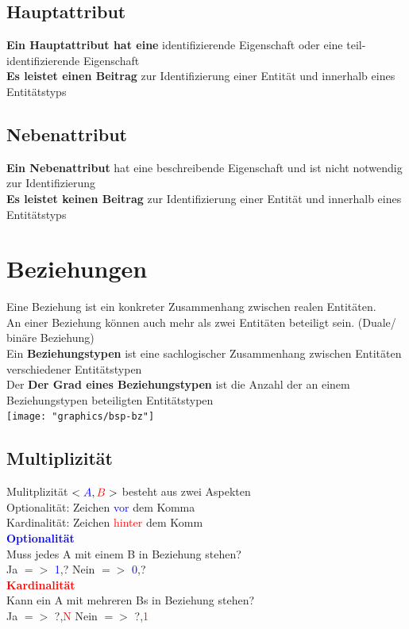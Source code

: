 \documentclass{scrreprt}
\newcommand\tab[1][1cm]{\hspace*{#1}}
\begin{document}
\subsection{Hauptattribut}
\textbf{Ein Hauptattribut hat eine} identifizierende Eigenschaft oder eine teil-identifizierende Eigenschaft
\\\textbf{Es leistet einen Beitrag} zur Identifizierung einer Entität und innerhalb eines Entitätstyps
\subsection{Nebenattribut}
\textbf{Ein Nebenattribut} hat eine beschreibende Eigenschaft und ist nicht notwendig zur Identifizierung
\\\textbf{Es leistet keinen Beitrag} zur Identifizierung einer Entität und innerhalb eines Entitätstyps
\section{Beziehungen}
Eine Beziehung ist ein konkreter Zusammenhang zwischen realen Entitäten.
\\An einer Beziehung können auch mehr als zwei Entitäten beteiligt sein. (Duale/ binäre Beziehung)
\\Ein \textbf{Beziehungstypen} ist eine sachlogischer Zusammenhang zwischen Entitäten verschiedener Entitätstypen
\\Der \textbf{Der Grad eines Beziehungstypen} ist die Anzahl der an einem Beziehungstypen beteiligten Entitätstypen
\\\texttt{[image: "graphics/bsp-bz"]}
\subsection{Multiplizität}
Mulitplizität $<\textcolor{blue}{A},\textcolor{red}{B}>$ besteht aus zwei Aspekten
\\\tab Optionalität: Zeichen \textcolor{blue}{vor} dem Komma
\\\tab Kardinalität: Zeichen \textcolor{red}{hinter} dem Komm
\\\textcolor{blue}{\textbf{Optionalität}}
\\\tab Muss jedes A mit einem B in Beziehung stehen?
\\\tab Ja $=>$ \textcolor{blue}{1},? \tab Nein $=>$ \textcolor{blue}{0},?
\\\textcolor{red}{\textbf{Kardinalität}}
\\\tab Kann ein A mit mehreren Bs in Beziehung stehen?
\\\tab Ja $=>$ ?,\textcolor{red}{N} \tab Nein $=>$ ?,\textcolor{red}{1}
\end{document}
